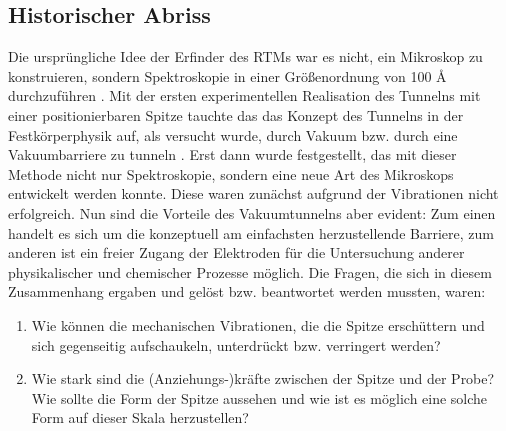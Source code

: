 \subsection{Historischer Abriss}
Die ursprüngliche Idee der Erfinder des RTMs 
war es nicht, ein Mikroskop zu konstruieren,
sondern Spektroskopie in einer Größenordnung von 
100 \r{A} durchzuführen \cite{binnig1987scanning}.
Mit der ersten experimentellen Realisation \cite{thompson1976thermal}
des Tunnelns mit einer positionierbaren Spitze tauchte das 
das Konzept des Tunnelns in der 
Festkörperphysik auf, als versucht wurde, durch Vakuum bzw. durch
eine Vakuumbarriere zu tunneln \cite{binnig1982tunneling}. 
Erst dann wurde festgestellt, das mit dieser Methode nicht nur
Spektroskopie, sondern eine neue Art des Mikroskops entwickelt werden
konnte.
Diese
waren zunächst aufgrund der Vibrationen nicht erfolgreich. Nun sind
die Vorteile des Vakuumtunnelns aber evident: 
Zum einen handelt es sich um die konzeptuell am einfachsten
herzustellende Barriere, zum anderen ist ein freier Zugang 
der Elektroden für die Untersuchung anderer
physikalischer und chemischer Prozesse möglich.
Die Fragen, die sich in diesem Zusammenhang
ergaben und gelöst bzw. beantwortet werden mussten, waren:

\begin{enumerate}
\item Wie können die mechanischen Vibrationen, die die Spitze
erschüttern und sich gegenseitig aufschaukeln, unterdrückt bzw.
verringert werden?
\item Wie stark sind die (Anziehungs-)kräfte zwischen der Spitze
und der Probe? Wie sollte die Form der Spitze aussehen und wie
ist es möglich eine solche Form auf dieser Skala herzustellen?
\end{enumerate}

